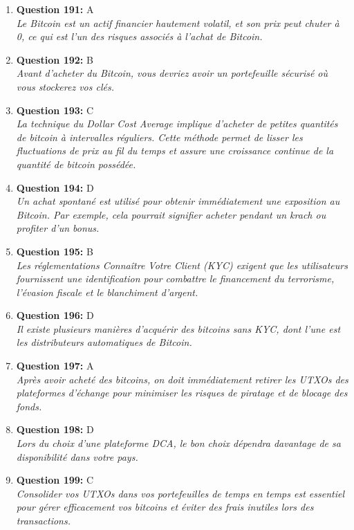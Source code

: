 \documentclass[12pt,a4paper]{article}
\begin{document}
\begin{enumerate}
\item \textbf{Question 191:} A
\\ \textit{Le Bitcoin est un actif financier hautement volatil, et son prix peut chuter à 0, ce qui est l'un des risques associés à l'achat de Bitcoin.}

\item \textbf{Question 192:} B
\\ \textit{Avant d'acheter du Bitcoin, vous devriez avoir un portefeuille sécurisé où vous stockerez vos clés.}

\item \textbf{Question 193:} C
\\ \textit{La technique du Dollar Cost Average implique d'acheter de petites quantités de bitcoin à intervalles réguliers. Cette méthode permet de lisser les fluctuations de prix au fil du temps et assure une croissance continue de la quantité de bitcoin possédée.}

\item \textbf{Question 194:} D
\\ \textit{Un achat spontané est utilisé pour obtenir immédiatement une exposition au Bitcoin. Par exemple, cela pourrait signifier acheter pendant un krach ou profiter d'un bonus.}

\item \textbf{Question 195:} B
\\ \textit{Les réglementations Connaître Votre Client (KYC) exigent que les utilisateurs fournissent une identification pour combattre le financement du terrorisme, l'évasion fiscale et le blanchiment d'argent.}

\item \textbf{Question 196:} D
\\ \textit{Il existe plusieurs manières d'acquérir des bitcoins sans KYC, dont l'une est les distributeurs automatiques de Bitcoin.}

\item \textbf{Question 197:} A
\\ \textit{Après avoir acheté des bitcoins, on doit immédiatement retirer les UTXOs des plateformes d'échange pour minimiser les risques de piratage et de blocage des fonds.}

\item \textbf{Question 198:} D
\\ \textit{Lors du choix d'une plateforme DCA, le bon choix dépendra davantage de sa disponibilité dans votre pays.}

\item \textbf{Question 199:} C
\\ \textit{Consolider vos UTXOs dans vos portefeuilles de temps en temps est essentiel pour gérer efficacement vos bitcoins et éviter des frais inutiles lors des transactions.}


\end{enumerate}
\end{document}
